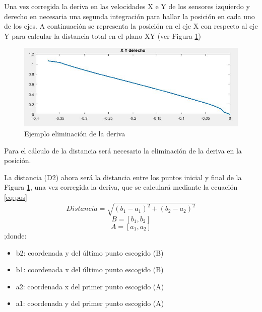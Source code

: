 \begin{itemize}
	
	Una vez corregida la deriva en las velocidades X e Y de los sensores izquierdo y derecho en necesaria una segunda integración para hallar la posición en cada uno de los ejes. A continuación se representa la posición en el eje X con respecto al eje Y para calcular la distancia total en el plano XY (ver Figura \ref{fig:posi})
	\begin{figure}[H]
		\centering
		\includegraphics[width=1\textwidth]{./graphics/posi}
		\caption{Ejemplo eliminación de la deriva} \label{fig:posi}
		
	\end{figure}
	
	Para el cálculo de la distancia será necesario la eliminación de la deriva en la posición.
	
	La distancia (D2) ahora será la distancia entre los puntos inicial y final de la Figura \ref{fig:posi}, una vez corregida la deriva, que se calculará mediante la ecuación \ref{eq:pos}
		\begin{equation}\label{eq:pos}
		Distancia = \sqrt{(b_{1}-a_{1})^{2}+(b_{2}-a_{2})^{2}}
		\end{equation}
		\begin{equation}\label{eq:punto2}
			B = [b_{1},b_{2}]	
		\end{equation}
		\begin{equation}\label{eq:puntos1}
			A = [a_{1},a_{2}]
		\end{equation}
		;donde:
		\begin{itemize}
		\item b2: coordenada y del último punto escogido (B)
		\item b1: coordenada x del último punto escogido (B)
		\item a2: coordenada x del primer punto escogido (A)
		\item a1: coordenada y del primer punto escogido (A)
		\end{itemize}
\end{itemize}



